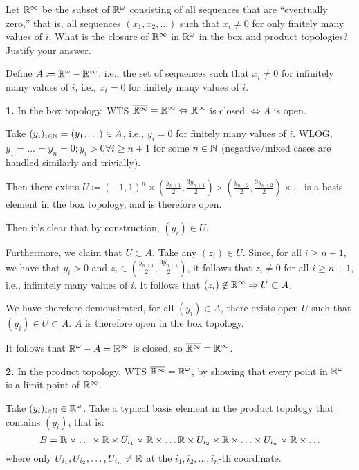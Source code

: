 \documentclass[a4paper, 12pt]{article}
\begin{document}
\begin{problem} 
Let $\mathbb{R}^\infty$ be the subset of $\mathbb{R}^\omega$ consisting of all sequences that are ``eventually zero,'' that is, all sequences $(x_1, x_2, \ldots)$ such that $x_i \neq 0$ for only finitely many values of $i$. What is the closure of $\mathbb{R}^\infty$ in $\mathbb{R}^\omega$ in the box and product topologies? Justify your answer.
\end{problem}
\begin{solution}
    Define $A \coloneqq \mathbb{R}^\omega - \mathbb{R}^\infty$, i.e., the set of sequences such that $x_i \neq 0$ for infinitely many values of $i$, i.e., $x_i = 0$ for finitely many values of $i$.

    \textbf{1.} In the box topology. WTS $\overline{\mathbb{R}^\infty} = {\mathbb{R}^\infty} \Leftrightarrow \mathbb{R}^\infty$ is closed $\Leftrightarrow A$ is open.
    

    Take $(y_i)_{i \in \mathbb{N}} = (y_1, \ldots) \in A$, i.e., $y_i = 0$ for finitely many values of $i$. WLOG, $y_1 = \ldots = y_n = 0; y_i > 0 \forall i \geq n+1$ for some $n \in \mathbb{N}$ (negative/mixed cases are handled similarly and trivially).

    Then there exists $U \coloneqq (-1, 1)^n \times (\frac{y_{n+1}}{2}, \frac{3y_{n+1}}{2}) \times (\frac{y_{n+2}}{2}, \frac{3y_{n+2}}{2}) \times \ldots$ is a basis element in the box topology, and is therefore open.

    Then it's clear that by construction, $(y_i) \in U$.

    Furthermore, we claim that $U \subset A$. Take any $(z_i) \in U$. Since, for all $i \geq n+1$, we have that $y_i > 0$ and  $z_i \in (\frac{y_{n+1}}{2}, \frac{3y_{n+1}}{2})$, it follows that $z_i \neq 0$ for all $i \geq n+1$, i.e., infinitely many values of $i$. It follows that $(z_i) \not \in \mathbb{R}^{\infty} \Rightarrow U \subset A  $.

    We have therefore demonstrated, for all $(y_i) \in A$, there exists open $U$ such that $(y_i) \in U \subset A$. $A$ is therefore open in the box topology.

    It follows that $\mathbb{R}^\omega - A = \mathbb{R}^\infty$ is closed, so $\overline{\mathbb{R}^\infty} = \mathbb{R}^\infty$.

    \textbf{2.} In the product topology. WTS $\overline{\mathbb{R}^\infty} = \mathbb{R}^\omega$, by showing that every point in $\mathbb{R}^\omega$ is a limit point of $\mathbb{R}^\infty$.

    Take $(y_i)_{i \in \mathbb{N}} \in \mathbb{R}^\omega$. Take a typical basis element in the product topology that contains $(y_i)$, that is:
    \begin{equation*}
    B = \mathbb{R} \times \ldots \times \mathbb{R} \times U_{i_1} \times \mathbb{R} \times \ldots \mathbb{R} \times U_{i_2} \times \mathbb{R} \times \ldots \times U_{i_n} \times \mathbb{R} \times \ldots
    \end{equation*}
    where only $U_{i_1}, U_{i_2}, \ldots, U_{i_n} \neq \mathbb{R}$ at the $i_1, i_2, \ldots, i_n$-th coordinate.


\end{solution}
\end{document}
